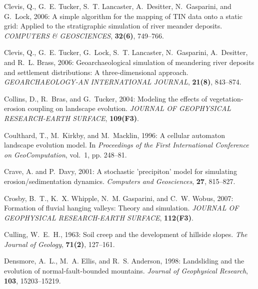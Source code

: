 \documentclass[12pt,reqno]{amsart}
\begin{document}
\begin{thebibliography}{41}
Clevis, Q., G.~E. Tucker, S.~T. Lancaster, A.~Desitter, N.~Gasparini, and
  G.~Lock, {2006}{}: {A simple algorithm for the mapping of TIN
  data onto a static grid: Applied to the stratigraphic simulation of river
  meander deposits}. {\em {COMPUTERS \& GEOSCIENCES}\/}, {\bf {32}({6})},
  {749--766}.

Clevis, Q., G.~E. Tucker, G.~Lock, S.~T. Lancaster, N.~Gasparini, A.~Desitter,
  and R.~L. Brass, {2006}{}: {Geoarchaeological simulation of
  meandering river deposits and settlement distributions: A three-dimensional
  approach}. {\em {GEOARCHAEOLOGY-AN INTERNATIONAL JOURNAL}\/}, {\bf
  {21}({8})}, {843--874}.

Collins, D., R.~Bras, and G.~Tucker, {2004}: {Modeling the effects of
  vegetation-erosion coupling on landscape evolution}. {\em {JOURNAL OF
  GEOPHYSICAL RESEARCH-EARTH SURFACE}\/}, {\bf {109}({F3})}.

Coulthard, T., M.~Kirkby, and M.~Macklin, 1996: {A cellular automaton landscape
  evolution model}. In {\em Proceedings of the First International Conference
  on GeoComputation\/}, vol.~1, pp. 248--81.

Crave, A. and P.~Davy, 2001: A stochastic 'precipiton' model for simulating
  erosion/sedimentation dynamics. {\em Computers and Geosciences\/}, {\bf 27},
  815--827.

Crosby, B.~T., K.~X. Whipple, N.~M. Gasparini, and C.~W. Wobus, {2007}:
  {Formation of fluvial hanging valleys: Theory and simulation}. {\em {JOURNAL
  OF GEOPHYSICAL RESEARCH-EARTH SURFACE}\/}, {\bf {112}({F3})}.

Culling, W.~E.~H., 1963: Soil creep and the development of hillside
  slopes. {\em The Journal of Geology\/}, {\bf 71(2)}, 127--161.

Densmore, A.~L., M.~A. Ellis, and R.~S. Anderson, 1998: Landsliding and the
  evolution of normal-fault-bounded mountains. {\em Journal of Geophysical
  Research\/}, {\bf 103}, 15203--15219.


\end{thebibliography}
\end{document}
